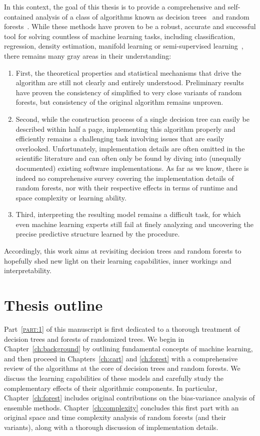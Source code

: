 In this context, the goal of this thesis is to provide a comprehensive and self-contained analysis
of a class of algorithms known as decision trees~\citep{breiman:1984} and
random forests~\citep{breiman:2001}. While these
methods have proven to be a robust, accurate and successful tool for solving
countless of machine learning tasks, including classification, regression,
density estimation, manifold learning or semi-supervised
learning~\citep{criminisi:2013}, there remains many gray areas in their
understanding:
\begin{enumerate}
\item First, the theoretical properties and statistical mechanisms that drive
the algorithm are still not clearly and entirely understood. Preliminary
results have proven the consistency of simplified to very close variants of
random forests, but consistency of the original algorithm remains unproven.
\item Second, while the construction process of a single decision tree can
easily be described within half a page, implementing this algorithm properly
and efficiently remains a challenging task involving issues that are easily
overlooked. Unfortunately, implementation details are often omitted in the
scientific literature and can often only be found by diving into
(unequally documented) existing software implementations. As far as we know,
there is indeed no comprehensive survey covering the implementation details of
random forests, nor with their respective effects in terms of runtime and space
complexity or learning ability.
\item Third, interpreting the resulting model remains a difficult task,
for which even machine learning experts still fail at finely analyzing and
uncovering the precise predictive structure learned by the procedure.
\end{enumerate}
Accordingly, this work aims at revisiting decision trees and random forests to
hopefully shed new light on their learning capabilities, inner workings and
interpretability.

\section{Thesis outline}

Part~\textsc{\ref{part:1}} of this manuscript is first dedicated to a thorough
treatment of decision trees and forests of randomized trees. We begin in
Chapter~\ref{ch:background} by outlining fundamental concepts of machine
learning, and then proceed in Chapters~\ref{ch:cart} and \ref{ch:forest} with a
comprehensive review of the algorithms at the core of decision trees and random
forests. We discuss the learning capabilities of these models and carefully
study the complementary effects of their algorithmic components. In particular,
Chapter~\ref{ch:forest} includes original contributions on the bias-variance
analysis of ensemble methods. Chapter~\ref{ch:complexity} concludes this first
part with an original space and time complexity analysis of random forests (and
their variants), along with a thorough discussion of implementation details.

